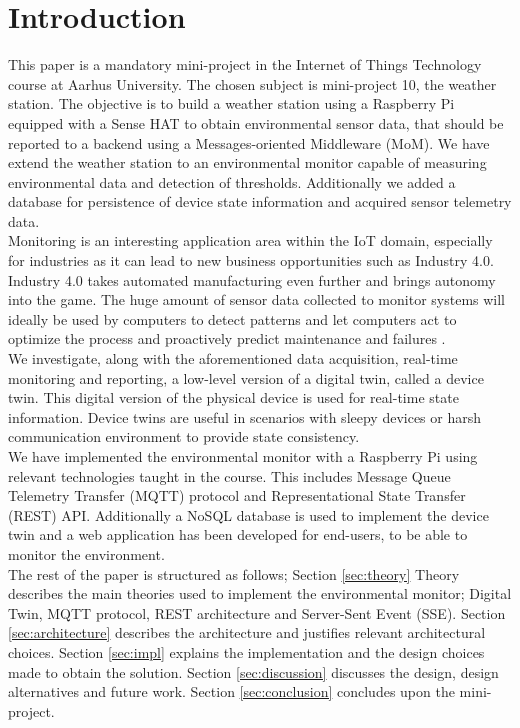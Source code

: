 \section{Introduction}
This paper is a mandatory mini-project in the Internet of Things Technology course at Aarhus University. The chosen subject is mini-project 10, the weather station. The objective is to build a weather station using a Raspberry Pi equipped with a Sense HAT to obtain environmental sensor data, that should be reported to a backend using a Messages-oriented Middleware (MoM). We have extend the weather station to an environmental monitor capable of measuring environmental data and detection of thresholds. Additionally we added a database for persistence of device state information and acquired sensor telemetry data. \\

Monitoring is an interesting application area within the IoT domain, especially for industries as it can lead to new business opportunities such as Industry 4.0. Industry 4.0 takes automated manufacturing even further and brings autonomy into the game. The huge amount of sensor data collected to monitor systems will ideally be used by computers to detect patterns and let computers act to optimize the process and proactively predict maintenance and failures \cite{gilchrist_2016}. \\

We investigate, along with the aforementioned data acquisition, real-time monitoring and reporting, a low-level version of a digital twin, called a device twin. This digital version of the physical device is used for real-time state information. Device twins are useful in scenarios with sleepy devices or harsh communication environment to provide state consistency. \\

We have implemented the environmental monitor with a Raspberry Pi using relevant technologies taught in the course. This includes Message Queue Telemetry Transfer (MQTT) protocol and Representational State Transfer (REST) API. Additionally a NoSQL database is used to implement the device twin and a web application has been developed for end-users, to be able to monitor the environment. \\

The rest of the paper is structured as follows; Section \ref{sec:theory} Theory describes the main theories used to implement the environmental monitor; Digital Twin, MQTT protocol, REST architecture and Server-Sent Event (SSE). Section \ref{sec:architecture} describes the architecture and justifies relevant architectural choices. Section \ref{sec:impl} explains the implementation and the design choices made to obtain the solution. Section \ref{sec:discussion} discusses the design, design alternatives and future work. Section \ref{sec:conclusion} concludes upon the mini-project.


